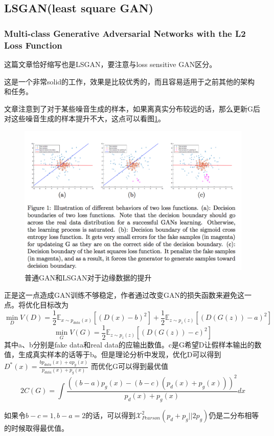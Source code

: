 \documentclass[a4paper]{article}
\begin{document}
\subsection{LSGAN(least square GAN)}
\subsubsection{Multi-class Generative Adversarial Networks with the L2 Loss Function\cite{DBLP:journals/corr/MaoLXLW16}}
这篇文章恰好缩写也是LSGAN，要注意与loss sensitive GAN区分。

这是一个非常solid的工作，效果是比较优秀的，而且容易适用于之前其他的架构和任务。

文章注意到了对于某些噪音生成的样本，如果离真实分布较远的话，那么更新G后对这些噪音生成的样本提升不大，这点可以看图\ref{fig:46}。
\begin{figure}[H]
\centering
\includegraphics[width=\textwidth]{./img/46.png}
\caption{普通GAN和LSGAN对于边缘数据的提升}
\label{fig:46}
\end{figure}
正是这一点造成GAN训练不够稳定，作者通过改变GAN的损失函数来避免这一点。将优化目标改为
$$\min\limits_D V(D) =\frac{1}{2}\mathbb{E}_{x\sim p_{data}(x)}[(D(x)-b)^2]
+ \frac{1}{2}\mathbb{E}_{z\sim p_z(z)}[(D(G(z))-a)^2]$$
$$\min\limits_G V(G) = \frac{1}{2}\mathbb{E}_{z \sim p_z(z)}[(D(G(z))-c)^2]$$
其中a、b分别是fake data和real data的应输出数值。c是G希望D让假样本输出的数值，生成真实样本的话等于b。但是理论分析中发现，优化D可以得到$D^*(x) = \frac{bp_{data}(x) + ap_g(x)}{p_{data}(x) + p_g(x)}$
而优化G可以得到最优值$$2C(G) = \int \frac{((b-a)p_g(x)-(b-c)(p_d(x)+p_g(x)))^2}{p_d(x)+p_g(x)}dx$$

如果令$b-c=1,b-a=2$的话，可以得到$\mathcal{X}^2_{Pearson}(p_d+p_g||2p_g)$仍是二分布相等的时候取得最优值。
\end{document}
